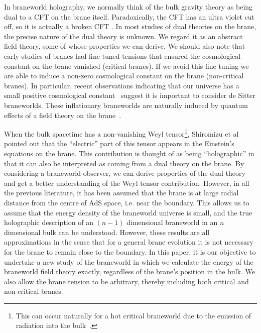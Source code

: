 \documentclass[a4paper,12pt]{article}
\begin{document}
In braneworld holography, we normally think of the bulk gravity theory
as being dual to a CFT on the brane itself. Paradoxically, the CFT has
an ultra violet cut off, so it is actually a broken CFT
\cite{Kraus:domainwalls,Gubser:gravity}. In most studies of dual
theories on the brane, the precise nature of the dual theory is
unknown. We regard it as an abstract field theory, some of whose
properties we can derive. We should also note that early studies of
branes \cite{Randall:compactification} had fine tuned tensions that
ensured the cosmological constant on the brane vanished (critical
branes). If we avoid this fine tuning we are able to induce a non-zero
cosmological constant on the brane \cite{Karch:local} (non-critical
branes). In particular, recent observations indicating that our
universe has a small positive cosmological constant~\cite{Riess:astro,
Perlmutter:astro} suggest it is important to consider de Sitter
braneworlds. These inflationary braneworlds are naturally induced by
quantum effects of a field theory on the
brane~\cite{Hawking:newworld,Nojiri:inflation,Nojiri:brane}.

When the bulk spacetime has a non-vanishing Weyl tensor\footnote{This
can occur naturally for a hot critical braneworld due to the emission
of radiation into the bulk~\cite{Hebecker:rs2}.}, Shiromizu et al
\cite{Shiromizu:3brane} pointed out that the ``electric'' part of this
tensor appears in the Einstein's equations on the brane. This
contribution is thought of as being ``holographic'' in that it can
also be interpreted as coming from a dual theory on the brane. By
considering a braneworld observer, we can derive properties of the
dual theory and get a better understanding of the Weyl tensor
contribution. However, in all the previous literature, it has been
assumed that the brane is at large radial distance from the centre of
AdS space, i.e. near the boundary.  This allows us to assume that the
energy density of the braneworld universe is small, and the true
holographic description of an $(n-1)$ dimensional braneworld in an $n$
dimensional bulk can be understood.  However, these results are all
approximations in the sense that for a general brane evolution it is
not necessary for the brane to remain close to the boundary.  In this
paper, it is our objective to undertake a new study of the braneworld
in which we calculate the energy of the braneworld field theory
exactly, regardless of the brane's position in the bulk. We also allow
the brane tension to be arbitrary, thereby including both critical and
non-critical branes.
\end{document}
